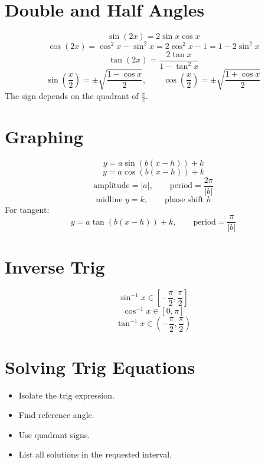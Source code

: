 \documentclass[11pt]{article}
\begin{document}
\section*{Double and Half Angles}
\[
\sin(2x)=2\sin x\cos x
\]
\[
\cos(2x)=\cos^2x-\sin^2x=2\cos^2x-1=1-2\sin^2x
\]
\[
\tan(2x)=\frac{2\tan x}{1-\tan^2x}
\]
\[
\sin\left(\frac x2\right)=\pm\sqrt{\frac{1-\cos x}{2}},\qquad
\cos\left(\frac x2\right)=\pm\sqrt{\frac{1+\cos x}{2}}
\]
The sign depends on the quadrant of $\frac x2$.

\section*{Graphing}
\[
y=a\sin(b(x-h))+k
\]
\[
y=a\cos(b(x-h))+k
\]
\[
\text{amplitude}=|a|,\qquad \text{period}=\frac{2\pi}{|b|}
\]
\[
\text{midline }y=k,\qquad \text{phase shift }h
\]
For tangent:
\[
y=a\tan(b(x-h))+k,\qquad \text{period}=\frac{\pi}{|b|}
\]

\section*{Inverse Trig}
\[
\sin^{-1}x\in\left[-\frac{\pi}{2},\frac{\pi}{2}\right]
\]
\[
\cos^{-1}x\in[0,\pi]
\]
\[
\tan^{-1}x\in\left(-\frac{\pi}{2},\frac{\pi}{2}\right)
\]

\section*{Solving Trig Equations}
\begin{itemize}
  \item Isolate the trig expression.
  \item Find reference angle.
  \item Use quadrant signs.
  \item List all solutions in the requested interval.
\end{itemize}
\end{document}
